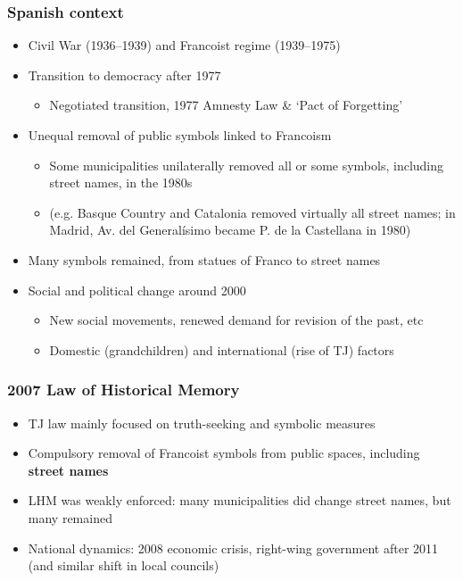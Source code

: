 \documentclass[aspectratio=43]{beamer}
\begin{document}

\begin{frame}
\frametitle{Spanish context}
\centering

\begin{itemize}
  \item<1-> Civil War (1936--1939) and Francoist regime (1939--1975)
  \item<1-> Transition to democracy after 1977
  \begin{itemize}
    \item Negotiated transition, 1977 Amnesty Law \& `Pact of Forgetting'
  \end{itemize}
  \item<2-> Unequal removal of public symbols linked to Francoism
  \begin{itemize}
    \item Some municipalities unilaterally removed all or some symbols, including street names, in the 1980s
    \item[] {\scriptsize (e.g. Basque Country and Catalonia removed virtually all street names; in Madrid, Av. del Generalísimo became P. de la Castellana in 1980)}
  \end{itemize}
  \item<2-> Many symbols remained, from statues of Franco to street names
  \item<3-> Social and political change around 2000
  \begin{itemize}
    \item New social movements, renewed demand for revision of the past, etc
    \item Domestic (grandchildren) and international (rise of TJ) factors
  \end{itemize}
\end{itemize}

\end{frame}

\begin{frame}
\frametitle{2007 Law of Historical Memory}
\centering

\begin{itemize}
  \item<1-> TJ law mainly focused on truth-seeking and symbolic measures
  \item<1-> Compulsory removal of Francoist symbols from public spaces, including \textbf{street names}
  \item<2-> LHM was weakly enforced: many municipalities did change street names, but many remained
  \item<2-> National dynamics: 2008 economic crisis, right-wing government after 2011 (and similar shift in local councils)
\end{itemize}

\end{frame}
\end{document}
